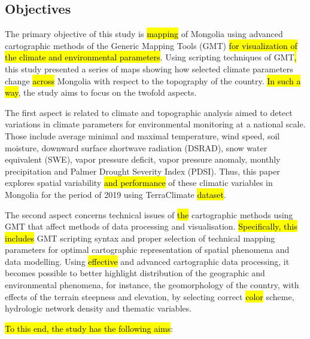\documentclass[geosciences,article,submit,pdftex,moreauthors]{Definitions/mdpi}
\begin{document}
\subsection{Objectives}
The primary objective of this study is \hl{mapping} of Mongolia using advanced cartographic methods of the Generic Mapping Tools (GMT) \hl{for visualization of the climate and environmental parameters}. Using scripting techniques of GMT\hl{,} this study presented a series of maps showing how selected climate parameters change \hl{across} Mongolia with respect to the topography of the country. \hl{In such a way}, the study aims to focus on the twofold aspects.

The first aspect is related to climate and topographic analysis aimed to detect variations in climate parameters for environmental monitoring at a national scale. Those include average minimal and maximal temperature, wind speed, soil moisture, downward surface shortwave radiation (DSRAD), snow water equivalent (SWE), vapor pressure deficit, vapor pressure anomaly, monthly precipitation and Palmer Drought Severity Index (PDSI). Thus, this paper explores spatial variability \hl{and performance} of these climatic variables in Mongolia for the period of 2019 using TerraClimate \hl{dataset}.

The second aspect concerns technical issues of \hl{the} cartographic methods using GMT that affect methods of data processing and visualisation. \hl{Specifically, this includes} GMT scripting syntax and proper selection of technical mapping parameters for optimal cartographic representation of spatial phenomena and data modelling. Using \hl{effective} and advanced cartographic data processing, it becomes possible to better highlight distribution of the geographic and environmental phenomena, for instance, the geomorphology of the country, with effects of the terrain steepness and elevation, by selecting correct \hl{color} scheme, hydrologic network density and thematic variables.

\hl{To this end, the study has the following aims}:     
\end{document}
